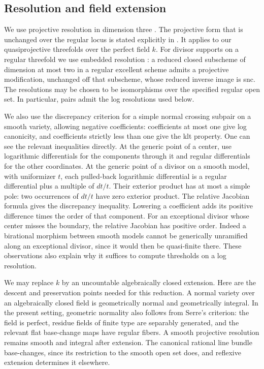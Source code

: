 \subsection{Resolution and field extension}

We use projective resolution in dimension three
\cite{cossartpiltant2008,cp2009,cp2019}.
The projective form that is unchanged over the regular locus is stated
explicitly in \cite[p.~1, introductory theorem]{cossart2008notes}.
It applies to our quasiprojective threefolds over the perfect field $k$.
For divisor supports on a regular threefold we use embedded resolution
\cite[Corollary~0.4]{cjs2009}: a reduced closed subscheme of dimension at
most two in a regular excellent scheme admits a projective modification,
unchanged off that subscheme, whose reduced inverse image is snc.
The resolutions may be chosen to be isomorphisms over the specified regular
open set.  In particular, pairs admit the log resolutions used below.

We also use the discrepancy criterion for a simple normal crossing
subpair on a smooth variety, allowing negative coefficients: coefficients
at most one give log canonicity, and coefficients strictly less than one
give the klt property.  One can see the relevant inequalities directly.
At the generic point of a center, use logarithmic differentials for the
components through it and regular differentials for the other coordinates.
At the generic point of a divisor on a smooth model, with uniformizer \(t\),
each pulled-back logarithmic differential is a regular differential plus
a multiple of \(dt/t\).  Their exterior product has at most a simple pole:
two occurrences of \(dt/t\) have zero exterior product.  The relative
Jacobian formula gives the discrepancy inequality.  Lowering a coefficient
adds its positive difference times the order of that component.
For an exceptional divisor whose center misses the boundary, the relative
Jacobian has positive order.  Indeed a birational morphism between smooth
models cannot be generically unramified along an exceptional divisor,
since it would then be quasi-finite there.  These observations also explain
why it suffices to compute thresholds on a log resolution.

We may replace \(k\) by an uncountable algebraically closed extension.
Here are the descent and preservation points needed for this reduction.
A normal variety over an algebraically closed field is geometrically
normal and geometrically integral.  In the present setting, geometric
normality also follows from Serre's criterion: the field is perfect,
residue fields of finite type are separably generated, and the relevant
flat base-change maps have regular fibers.  A smooth projective resolution
remains smooth and integral after extension.  The canonical rational line
bundle base-changes, since its restriction to the smooth open set does,
and reflexive extension determines it elsewhere.

